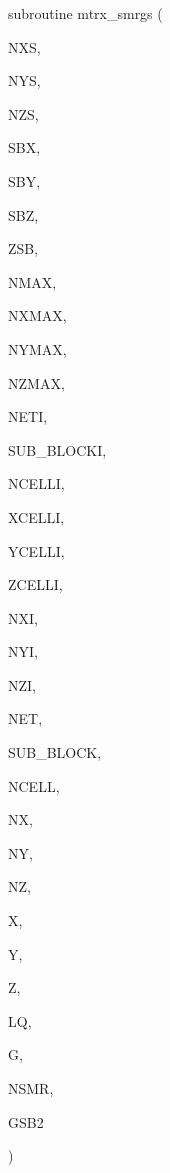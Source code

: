 {\footnotesize\ttfamily subroutine mtrx\+\_\+smrgs (\begin{DoxyParamCaption}\item[{integer}]{N\+XS,  }\item[{integer}]{N\+YS,  }\item[{integer}]{N\+ZS,  }\item[{real}]{S\+BX,  }\item[{real}]{S\+BY,  }\item[{real}]{S\+BZ,  }\item[{real}]{Z\+SB,  }\item[{integer}]{N\+M\+AX,  }\item[{integer}]{N\+X\+M\+AX,  }\item[{integer}]{N\+Y\+M\+AX,  }\item[{integer}]{N\+Z\+M\+AX,  }\item[{integer}]{N\+E\+TI,  }\item[{integer}]{S\+U\+B\+\_\+\+B\+L\+O\+C\+KI,  }\item[{integer, dimension(sub\+\_\+blocki)}]{N\+C\+E\+L\+LI,  }\item[{real, dimension(nxmax,sub\+\_\+blocki)}]{X\+C\+E\+L\+LI,  }\item[{real, dimension(nymax,sub\+\_\+blocki)}]{Y\+C\+E\+L\+LI,  }\item[{real, dimension(nzmax,sub\+\_\+blocki)}]{Z\+C\+E\+L\+LI,  }\item[{integer, dimension(sub\+\_\+blocki)}]{N\+XI,  }\item[{integer, dimension(sub\+\_\+blocki)}]{N\+YI,  }\item[{integer, dimension(sub\+\_\+blocki)}]{N\+ZI,  }\item[{integer}]{N\+ET,  }\item[{integer}]{S\+U\+B\+\_\+\+B\+L\+O\+CK,  }\item[{integer, dimension(sub\+\_\+block)}]{N\+C\+E\+LL,  }\item[{integer, dimension(sub\+\_\+block)}]{NX,  }\item[{integer, dimension(sub\+\_\+block)}]{NY,  }\item[{integer, dimension(sub\+\_\+block)}]{NZ,  }\item[{real, dimension(nxmax,sub\+\_\+block)}]{X,  }\item[{real, dimension(nymax,sub\+\_\+block)}]{Y,  }\item[{real, dimension(nzmax,sub\+\_\+block)}]{Z,  }\item[{integer}]{LQ,  }\item[{complex, dimension(nmax,neti)}]{G,  }\item[{integer}]{N\+S\+MR,  }\item[{complex, dimension(nsmr/3,3)}]{G\+S\+B2 }\end{DoxyParamCaption})}


